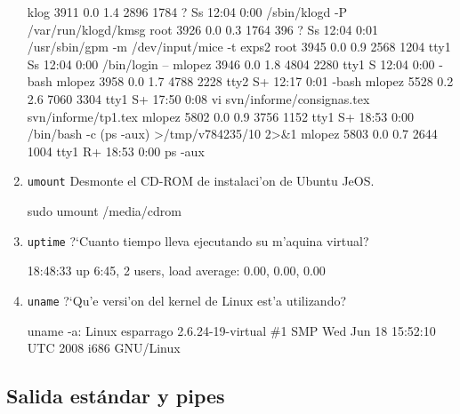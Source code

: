 \begin{enumerate}
\begin{envCodigo}
klog      3911  0.0  1.4   2896  1784 ?        Ss   12:04   0:00 /sbin/klogd -P /var/run/klogd/kmsg
root      3926  0.0  0.3   1764   396 ?        Ss   12:04   0:01 /usr/sbin/gpm -m /dev/input/mice -t exps2
root      3945  0.0  0.9   2568  1204 tty1     Ss   12:04   0:00 /bin/login --       
mlopez    3946  0.0  1.8   4804  2280 tty1     S    12:04   0:00 -bash
mlopez    3958  0.0  1.7   4788  2228 tty2     S+   12:17   0:01 -bash
mlopez    5528  0.2  2.6   7060  3304 tty1     S+   17:50   0:08 vi svn/informe/consignas.tex svn/informe/tp1.tex
mlopez    5802  0.0  0.9   3756  1152 tty1     S+   18:53   0:00 /bin/bash -c (ps -aux) >/tmp/v784235/10 2>&1
mlopez    5803  0.0  0.7   2644  1004 tty1     R+   18:53   0:00 ps -aux
\end{envCodigo}

\item \texttt{umount} Desmonte el CD-ROM de instalaci'on de Ubuntu JeOS.

\begin{envRespuesta}
sudo umount /media/cdrom
\end{envRespuesta}

\item \texttt{uptime} ?`Cuanto tiempo lleva ejecutando su m'aquina virtual?

\begin{envCodigo}
18:48:33 up  6:45,  2 users,  load average: 0.00, 0.00, 0.00
\end{envCodigo}

\item \texttt{uname} ?`Qu'e versi'on del kernel de Linux est'a utilizando?

\begin{envCodigo}
uname -a:  Linux esparrago 2.6.24-19-virtual \#1 SMP Wed Jun 18 15:52:10 UTC 
2008 i686 GNU/Linux
\end{envCodigo}

\end{enumerate}

\subsection{Salida est\'andar y pipes}

